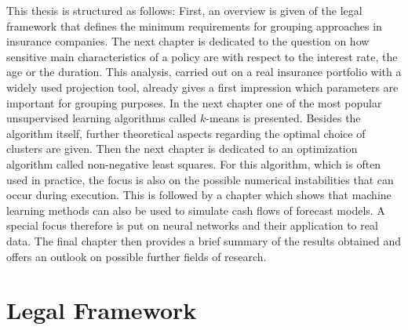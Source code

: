 This thesis is structured as follows: First, an overview is given of the legal framework that defines the minimum requirements for grouping approaches in insurance companies. The next chapter is dedicated to the question on how sensitive main characteristics of a policy are with respect to the interest rate, the age or the duration. This analysis, carried out on a real insurance portfolio with a widely used projection tool, already gives a first impression which parameters are important for grouping purposes. In the next chapter one of the most popular unsupervised learning algorithms called $k$-means is presented. Besides the algorithm itself, further theoretical aspects regarding the optimal choice of clusters are given. Then the next chapter is dedicated to an optimization algorithm called non-negative least squares. For this algorithm, which is often used in practice, the focus is also on the possible numerical instabilities that can occur during execution. This is followed by a chapter which shows that machine learning methods can also be used to simulate cash flows of forecast models. A special focus therefore is put on neural networks and their application to real data. The final chapter then provides a brief summary of the results obtained and offers an outlook on possible further fields of research.


\section{Legal Framework}

